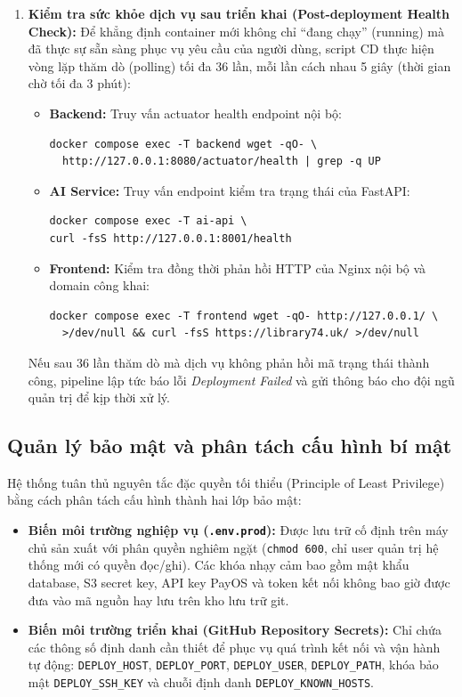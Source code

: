 \begin{enumerate}
    \item \textbf{Kiểm tra sức khỏe dịch vụ sau triển khai (Post-deployment Health Check):}
    Để khẳng định container mới không chỉ ``đang chạy'' (running) mà đã thực sự sẵn sàng phục vụ yêu cầu của người dùng, script CD thực hiện vòng lặp thăm dò (polling) tối đa 36 lần, mỗi lần cách nhau 5 giây (thời gian chờ tối đa 3 phút):
    \begin{itemize}[noitemsep]
        \item \textbf{Backend:} Truy vấn actuator health endpoint nội bộ:
\begin{verbatim}
docker compose exec -T backend wget -qO- \ 
  http://127.0.0.1:8080/actuator/health | grep -q UP
\end{verbatim}
        \item \textbf{AI Service:} Truy vấn endpoint kiểm tra trạng thái của FastAPI:
\begin{verbatim}
docker compose exec -T ai-api \
curl -fsS http://127.0.0.1:8001/health
\end{verbatim}
        \item \textbf{Frontend:} Kiểm tra đồng thời phản hồi HTTP của Nginx nội bộ và domain công khai:
\begin{verbatim}
docker compose exec -T frontend wget -qO- http://127.0.0.1/ \ 
  >/dev/null && curl -fsS https://library74.uk/ >/dev/null
\end{verbatim}
    \end{itemize}
    Nếu sau 36 lần thăm dò mà dịch vụ không phản hồi mã trạng thái thành công, pipeline lập tức báo lỗi \textit{Deployment Failed} và gửi thông báo cho đội ngũ quản trị để kịp thời xử lý.
\end{enumerate}

\subsection{Quản lý bảo mật và phân tách cấu hình bí mật}

Hệ thống tuân thủ nguyên tắc đặc quyền tối thiểu (Principle of Least Privilege) bằng cách phân tách cấu hình thành hai lớp bảo mật:
\begin{itemize}
    \item \textbf{Biến môi trường nghiệp vụ (\texttt{.env.prod}):} Được lưu trữ cố định trên máy chủ sản xuất với phân quyền nghiêm ngặt (\texttt{chmod 600}, chỉ user quản trị hệ thống mới có quyền đọc/ghi). Các khóa nhạy cảm bao gồm mật khẩu database, S3 secret key, API key PayOS và token kết nối không bao giờ được đưa vào mã nguồn hay lưu trên kho lưu trữ git.
    \item \textbf{Biến môi trường triển khai (GitHub Repository Secrets):} Chỉ chứa các thông số định danh cần thiết để phục vụ quá trình kết nối và vận hành tự động: \texttt{DEPLOY\_HOST}, \texttt{DEPLOY\_PORT}, \texttt{DEPLOY\_USER}, \texttt{DEPLOY\_PATH}, khóa bảo mật \texttt{DEPLOY\_SSH\_KEY} và chuỗi định danh \texttt{DEPLOY\_KNOWN\_HOSTS}.
\end{itemize}

